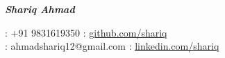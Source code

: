 \documentclass{article}
\begin{document}
\vspace*{-48pt}

\begin{frame}

  \centering \LARGE
  \hspace{-0.35mm}\emph{\textbf{Shariq Ahmad}}\\
\end{frame}
\vspace*{2pt}
\begin{frame}
   \centering
   \hspace{-4mm}: +91 9831619350
  \hspace{10.62cm}: \href{https://github.com/153079019shariq}{github.com/shariq}\\
  \textbf{}: ahmadshariq12@gmail.com
  \hfill{: \href{https://www.linkedin.com/in/shariq-ahmad-77957991/}{linkedin.com/shariq}}\\
  
\end{frame}
\end{document}
